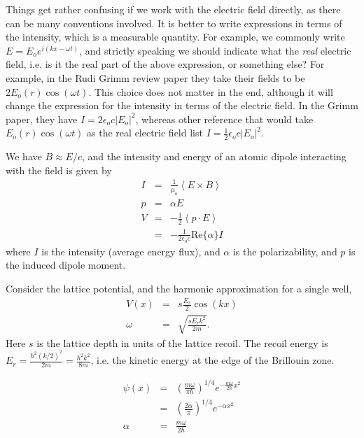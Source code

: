\documentclass{article}
\newcommand{\ensavg}[1]{\left< #1 \right>} %
\theoremstyle{definition}
\begin{document}
Things get rather confusing if we work with the electric field directly, as there can be many conventions involved. It is better to write expressions in terms of the intensity, which is a measurable quantity. For example, we commonly write $E = E_o e^{i(kx-\omega t)}$, and strictly speaking we should indicate what the \emph{real} electric field, i.e. is it the real part of the above expression, or something else? For example, in the Rudi Grimm review paper they take their fields to be $2 E_o(r) \cos(\omega t)$. This choice does not matter in the end, although it will change the expression for the intensity in terms of the electric field. In the Grimm paper, they have $I = 2\epsilon_o c |E_o|^2$, whereas other reference that would take $E_o(r) \cos(\omega t)$ as the real electric field list $I = \frac{1}{2} \epsilon_o c |E_o|^2$.

We have $B \approx E/c$, and the intensity and energy of an atomic dipole interacting with the field is given by
\begin{eqnarray}
I &=& \frac{1}{\mu_o} \ensavg{E \times B}\\
p &=& \alpha E\\
V &=& - \frac{1}{2} \ensavg{p \cdot E}\\
&=& - \frac{1}{2 \epsilon_o c} \text{Re}\{\alpha\} I
\end{eqnarray}
where $I$ is the intensity (average energy flux), and $\alpha$ is the polarizability, and $p$ is the induced dipole moment.

Consider the lattice potential, and the harmonic approximation for a single well,
\begin{eqnarray}
V(x) &=& s \frac{E_r}{2} \cos(kx)\\
\omega &=& \sqrt{\frac{s E_r k^2}{2m}} \label{eq:omega_lattice}.
\end{eqnarray}
Here $s$ is the lattice depth in units of the lattice recoil. The recoil energy is $E_r = \frac{\hbar^2 (k/2)^2}{2m} = \frac{\hbar^2 k^2}{8m}$, i.e. the kinetic energy at the edge of the Brillouin zone.

\begin{eqnarray}
\psi(x) &=& \left(\frac{m \omega}{\pi \hbar} \right)^{1/4} e^{- \frac{m \omega}{2 \hbar} x^2}\\
&=& \left(\frac{2 \alpha}{\pi} \right)^{1/4} e^{-\alpha x^2} \\
\alpha &=& \frac{m \omega}{2 \hbar} \label{eq:alpha_definition}
\end{eqnarray}
\end{document}
